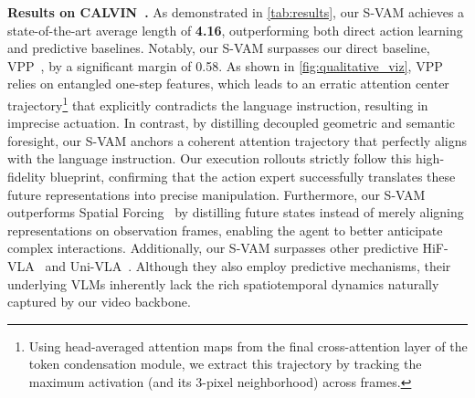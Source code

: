 \noindent \textbf{Results on CALVIN~\cite{mees2022calvin}.} 
As demonstrated in \cref{tab:results}, our S-VAM achieves a state-of-the-art average length of \textbf{4.16}, outperforming both direct action learning and predictive baselines. Notably, our S-VAM surpasses our direct baseline, VPP~\cite{huvideo}, by a significant margin of 0.58. As shown in \cref{fig:qualitative_viz}, VPP~\cite{huvideo} relies on entangled one-step features, which leads to an erratic attention center trajectory\footnote{Using head-averaged attention maps from the final cross-attention layer of the token condensation module, we extract this trajectory by tracking the maximum activation (and its 3-pixel neighborhood) across frames.} that explicitly contradicts the language instruction, resulting in imprecise actuation. In contrast, by distilling decoupled geometric and semantic foresight, our S-VAM anchors a coherent attention trajectory that perfectly aligns with the language instruction. Our execution rollouts strictly follow this high-fidelity blueprint, confirming that the action expert successfully translates these future representations into precise manipulation. Furthermore, our S-VAM outperforms Spatial Forcing~\cite{li2025spatial} by distilling future states instead of merely aligning representations on observation frames, enabling the agent to better anticipate complex interactions. Additionally, our S-VAM surpasses other predictive HiF-VLA~\cite{lin2025hif} and Uni-VLA~\cite{wang2025unified}. Although they also employ predictive mechanisms, their underlying VLMs inherently lack the rich spatiotemporal dynamics naturally captured by our video backbone.

